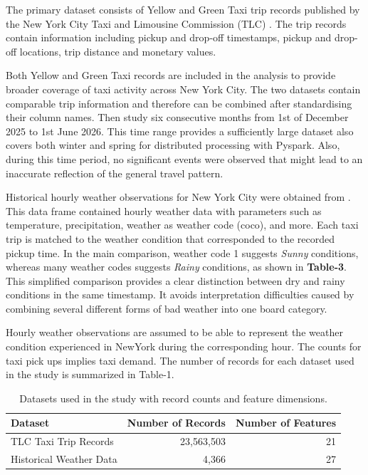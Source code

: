\documentclass[11pt]{article}
\begin{document}
The primary dataset consists of Yellow and Green Taxi trip records published by the New York City 
Taxi and Limousine Commission (TLC) \cite{NYC TLC TripData}. The trip records contain information 
including pickup and drop-off timestamps, pickup and drop-off locations, trip distance and monetary 
values.

Both Yellow and Green Taxi records are included in the analysis to provide broader coverage of taxi 
activity across New York City. The two datasets contain comparable trip information and therefore can be combined after standardising their column names. Then study six consecutive months from 1st of December 2025 to 1st June 2026. This time range provides a sufficiently large dataset also covers both winter and spring for distributed processing with Pyspark. Also, during this time period, no significant events were observed that might lead to an inaccurate reflection of the general travel pattern.

Historical hourly weather observations for New York City were obtained from \cite{meteostat}. This data frame contained hourly weather data with parameters such as temperature, precipitation, weather as weather code (coco), and more. Each taxi trip is matched to the weather condition that corresponded to the recorded pickup time. 
In the main comparison, weather code 1 suggests \textit{Sunny} conditions, whereas many weather codes suggests \textit{Rainy} conditions, as shown in \textbf{Table-3}. This simplified comparison provides a clear distinction between dry and rainy conditions in the same timestamp. It avoids interpretation difficulties caused by combining several different forms of bad weather into one board category.

Hourly weather observations are assumed to be able to represent the weather condition experienced in NewYork during the corresponding hour. The counts for taxi pick ups implies taxi demand. The number of records for each dataset used in the study is summarized in Table-1.

\begin{table}[ht]
    \centering
    \caption{Datasets used in the study with record counts and feature dimensions.}
    \label{tab:datasets}

    \begin{tabular}{lrr}
        \toprule
        \textbf{Dataset} &
        \textbf{Number of Records} &
        \textbf{Number of Features} \\
        \midrule

        TLC Taxi Trip Records &
        23,563,503 &
        21 \\

        Historical Weather Data &
        4,366 &
        27 \\

        \bottomrule
    \end{tabular}
\end{table}
\end{document}
